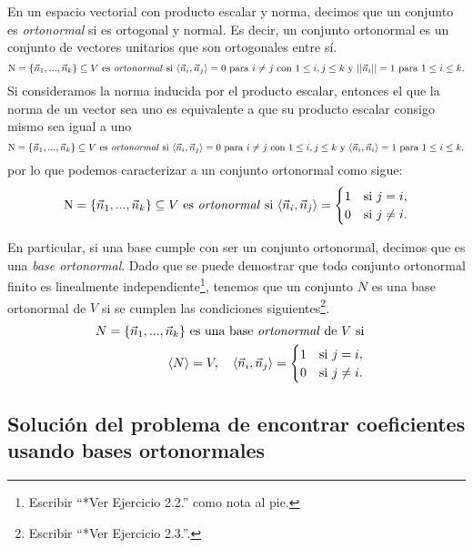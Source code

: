 \documentclass[12pt,dvipsnames]{article}
\numberwithin{equation}{section}
\begin{document}
En un espacio vectorial con producto escalar y norma, decimos que un conjunto es \emph{ortonormal} si es ortogonal y normal. Es decir, un conjunto ortonormal es un conjunto de vectores unitarios que son ortogonales entre sí.
\[
    \text{N}=\{\vec{n}_1,...,\vec{n}_k\}\subseteq V \ \text{es \emph{ortonormal} si} \ \langle \vec{n}_i , \vec{n}_j \rangle = 0 \text{ para } i\neq j \text{ con } 1\le i,j\le k \text{ y } ||\vec{n}_i||=1 \text{ para } 1\le i\le k.
\]
Si consideramos la norma inducida por el producto escalar, entonces el que la norma de un vector sea uno es equivalente a que su producto escalar consigo mismo sea igual a uno
\[
    \text{N}=\{\vec{n}_1,...,\vec{n}_k\}\subseteq V \ \text{es \emph{ortonormal} si} \ \langle \vec{n}_i , \vec{n}_j \rangle = 0 \text{ para } i\neq j \text{ con } 1\le i,j\le k \text{ y } \langle \vec{n}_i , \vec{n}_i \rangle=1 \text{ para } 1\le i\le k.
\]
por lo que podemos caracterizar a un conjunto ortonormal como sigue:
\[
    \text{N}=\{\vec{n}_1,...,\vec{n}_k\}\subseteq V \ \text{es \emph{ortonormal} si} \ \langle \vec{n}_i , \vec{n}_j \rangle = \begin{cases} 1 &\text{si } j=i, \\ 0 &\text{si } j\neq i. \end{cases}
\]

\noindent En particular, si una base cumple con ser un conjunto ortonormal, decimos que es una \emph{base ortonormal}. Dado que se puede demostrar que todo conjunto ortonormal finito es linealmente independiente\footnote{Escribir ``*Ver Ejercicio 2.2.'' como nota al pie.}, tenemos que un conjunto $N$ es una base ortonormal de $V$ si se cumplen las condiciones siguientes\footnote{Escribir ``*Ver Ejercicio 2.3.''.}. 
\begin{align*}
    N=\{\vec{n}_1,...,\vec{n}_k\} \text{ es una base \emph{ortonormal} de } V \text{ si}& & &\\
    \langle N \rangle = V, \quad \langle \vec{n}_i , \vec{n}_j \rangle = \begin{cases} 1 &\text{si } j=i, \\ 0 &\text{si } j\neq i. \end{cases}
\end{align*}

\subsection{Solución del problema de encontrar coeficientes usando bases ortonormales}
\end{document}
